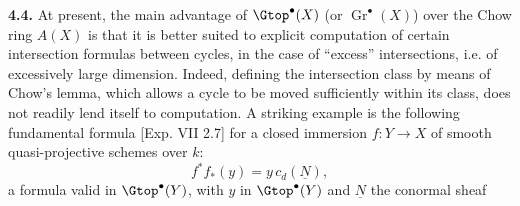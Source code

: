 \textbf{4.4.} At present, the main advantage of $\Gtop^\bullet(X)$ (or $\operatorname{Gr}^\bullet(X)$) over the Chow ring $A(X)$ is that it is better suited to explicit computation of certain intersection formulas between cycles, in the case of ``excess'' intersections, i.e. of excessively large dimension. Indeed, defining the intersection class by means of Chow's lemma, which allows a cycle to be moved sufficiently within its class, does not readily lend itself to computation. A striking example is the following fundamental formula [Exp. VII 2.7] for a closed immersion $f:Y\to X$ of smooth quasi-projective schemes over $k$:
\begin{equation}\tag{4.6}
 f^*f_*(y)=y\,c_d(\underline{N}),
\end{equation}
a formula valid in $\Gtop^\bullet(Y)$, with $y$ in $\Gtop^\bullet(Y)$ and $\underline{N}$ the conormal sheaf
